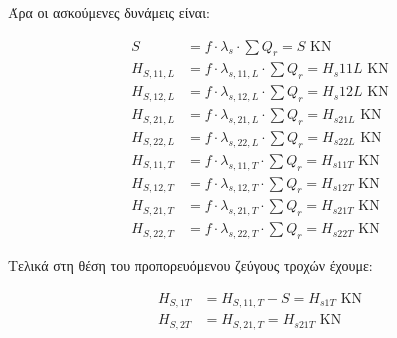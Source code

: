 Άρα οι ασκούμενες δυνάμεις είναι:

\begin{align*}
    S                &= f \cdot \lambda_s \cdot \sum{Q_r} = {{ S }} \text{ KN} \\
    H_{S,11,L}       &= f \cdot \lambda_{s,11,L} \cdot \sum{Q_r} = {{ H_s11L }} \text{ KN} \\
    H_{S,12,L}       &= f \cdot \lambda_{s,12,L} \cdot \sum{Q_r} = {{ H_s12L }} \text{ KN} \\
    H_{S,21,L}       &= f \cdot \lambda_{s,21,L} \cdot \sum{Q_r} = H_{{ s21L }} \text{ KN} \\
    H_{S,22,L}       &= f \cdot \lambda_{s,22,L} \cdot \sum{Q_r} = H_{{ s22L }} \text{ KN} \\
    H_{S,11,T}       &= f \cdot \lambda_{s,11,T} \cdot \sum{Q_r} = H_{{ s11T }} \text{ KN} \\
    H_{S,12,T}       &= f \cdot \lambda_{s,12,T} \cdot \sum{Q_r} = H_{{ s12T }} \text{ KN} \\
    H_{S,21,T}       &= f \cdot \lambda_{s,21,T} \cdot \sum{Q_r} = H_{{ s21T }} \text{ KN} \\
    H_{S,22,T}       &= f \cdot \lambda_{s,22,T} \cdot \sum{Q_r} = H_{{ s22T }} \text{ KN}
\end{align*}

Τελικά στη θέση του προπορευόμενου ζεύγους τροχών έχουμε:

\begin{align*}
    H_{S,1T} &= H_{S,11,T} - S = H_{{ s1T }} \text{ KN} \\
    H_{S,2T} &= H_{S,21,T} = H_{{ s21T }} \text{ KN}
\end{align*}

